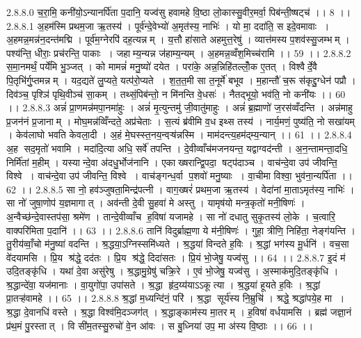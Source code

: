 2.8.8.0
च॒रा॒मि॒ कनी॑यो॒ऽन्यानर्पि॑ता प॒दानि॒ यज्व॑सु हवामहे वि॒ष्ठा लो॒कास्सु॒वीर॒मर्वा॒ पिब॑न्ती॒ष्षट्च॑ ।। 8 ।।
2.8.8.1
अ॒हम॑स्मि प्रथम॒जा ऋ॒तस्य॑ । पूर्व॑न्दे॒वेभ्यो॑ अ॒मृत॑स्य॒ नाभिः॑ । यो मा॒ ददा॑ति॒ स इदे॒वमावाः । अ॒हमन्न॒मन्न॑न॒दन्त॑मद्मि । पूर्व॑म॒ग्नेरपि॑ दह॒त्यन्नम् । य॒त्तौ हा॑साते अहमुत्त॒रेषु॑ । व्यात्त॑मस्य प॒शव॑स्सु॒जम्भम् । पश्य॑न्ति॒ धीराः॒ प्रच॑रन्ति॒ पाकाः । जहाम्य॒न्यन्न ज॑हाम्य॒न्यम् । अ॒हमन्न॒व्वँश॒मिच्च॑रामि ।। 59 ।।
2.8.8.2
स॒मा॒नमर्थं॒ पर्ये॑मि भु॒ञ्जत् । को मामन्नं॑ मनु॒ष्यो॑ दयेत । परा॑के॒ अन्न॒न्निहि॑तल्लोँ॒क ए॒तत् । विश्वैर्दे॒वै पि॒तृभि॑र्गु॒प्तमन्नम् । यद॒द्यते॑ लु॒प्यते॒ यत्प॑रो॒प्यते । श॒त॒त॒मी सा त॒नूर्मे॑ बभूव । म॒हान्तौ॑ च॒रू स॑कृद्दु॒ग्धेन॑ पप्रौ । दिव॑ञ्च॒ पृश्ञि॑ पृथि॒वीञ्च॑ सा॒कम् । तथ्सं॒पिब॑न्तो॒ न मि॑नन्ति वे॒धसः॑ । नैतद्भूयो॒ भव॑ति॒ नो कनी॑यः ।। 60 ।।
2.8.8.3
अन्नं॑ प्रा॒णमन्न॑मपा॒नमा॑हुः । अन्नं॑ मृ॒त्युन्तमु॑ जी॒वातु॑माहुः । अन्नं॑ ब्र॒ह्माणो॑ ज॒रस॑व्वँदन्ति । अन्न॑माहु प्र॒जन॑नं प्र॒जानाम् । मोघ॒मन्न॑व्विँन्दते॒ अप्र॑चेताः । स॒त्यं ब्र॑वीमि व॒ध इथ्स तस्य॑ । नार्य॒मणं॒ पुष्य॑ति॒ नो सखा॑यम् । केव॑लाघो भवति केवला॒दी । अ॒हं मे॒घस्स्त॒नय॒न्वऱ़्ष॑न्नस्मि । माम॑दन्त्य॒हम॑द्म्य॒न्यान् ।। 61 ।।
2.8.8.4
अ॒ह सद॒मृतो॑ भवामि । मदा॑दि॒त्या अधि॒ सर्वे॑ तपन्ति । दे॒वीव्वाँच॑मजनयन्त॒ यद्वाग्वद॑न्ती । अ॒न॒न्तामन्ता॒दधि॒ निर्मि॑तां म॒हीम् । यस्यान्दे॒वा अ॑दधु॒र्भोज॑नानि । एकाख्षरान्द्वि॒पदा॒॒ षट्प॑दाञ्च । वाच॑न्दे॒वा उप॑ जीवन्ति॒ विश्वे । वाच॑न्दे॒वा उप॑ जीवन्ति॒ विश्वे । वाच॑ङ्गन्ध॒र्वा प॒शवो॑ मनु॒ष्याः । वा॒चीमा विश्वा॒ भुव॑ना॒न्यर्पि॑ता ।। 62 ।।
2.8.8.5
सा नो॒ हव॑ञ्जुषता॒मिन्द्र॑पत्नी । वाग॒ख्षरं॑ प्रथम॒जा ऋ॒तस्य॑ । वेदा॑नां मा॒ताऽमृत॑स्य॒ नाभिः॑ । सा नो॑ जुषा॒णोप॑ य॒ज्ञमागात् । अव॑न्ती दे॒वी सु॒हवा॑ मे अस्तु । यामृष॑यो मन्त्र॒कृतो॑ मनी॒षिणः॑ । अ॒न्वैच्छ॑न्दे॒वास्तप॑सा॒ श्रमे॑ण । तान्दे॒वीव्वाँच॑ ह॒विषा॑ यजामहे । सा नो॑ दधातु सुकृ॒तस्य॑ लो॒के । च॒त्वारि॒ वाक्परि॑मिता प॒दानि॑ ।। 63 ।।
2.8.8.6
तानि॑ विदुर्ब्राह्म॒णा ये म॑नी॒षिणः॑ । गुहा॒ त्रीणि॒ निहि॑ता॒ नेङ्ग॑यन्ति । तु॒रीय॑व्वाँ॒चो म॑नु॒ष्या॑ वदन्ति । श्र॒द्धया॒ऽग्निस्समि॑ध्यते । श्र॒द्धया॑ विन्दते ह॒विः । श्र॒द्धां भग॑स्य मू॒र्धनि॑ । वच॒सा वे॑दयामसि । प्रि॒य श्र॑द्धे॒ दद॑तः । प्रि॒य श्र॑द्धे॒ दिदा॑सतः । प्रि॒यं भो॒जेषु॒ यज्व॑सु ।। 64 ।।
2.8.8.7
इ॒दं म॑ उदि॒तङ्कृ॑धि । यथा॑ दे॒वा असु॑रेषु । श्र॒द्धामु॒ग्रेषु॑ चक्रि॒रे । ए॒वं भो॒जेषु॒ यज्व॑सु । अ॒स्माक॑मुदि॒तङ्कृ॑धि । श्र॒द्धान्दे॑वा॒ यज॑मानाः । वा॒युगो॑पा॒ उपा॑सते । श्र॒द्धा हृ॑द॒य्य॑याऽऽकूत्या । श्र॒द्धया॑ हूयते ह॒विः । श्र॒द्धां प्रा॒तऱ्ह॑वामहे ।। 65 ।।
2.8.8.8
श्र॒द्धां म॒ध्यन्दि॑नं॒ परि॑ । श्र॒द्धा सूर्य॑स्य नि॒म्रुचि॑ । श्रद्धे॒ श्रद्धा॑पये॒ह मा । श्र॒द्धा दे॒वानधि॑ वस्ते । श्र॒द्धा विश्व॑मि॒दञ्जग॑त् । श्र॒द्धाङ्काम॑स्य मा॒तरम् । ह॒विषा॑ वर्धयामसि । ब्रह्म॑ जज्ञा॒नं प्र॑थ॒मं पु॒रस्तात् । वि सी॑म॒तस्सु॒रुचो॑ वे॒न आ॑वः । स बु॒ध्निया॑ उप॒ मा अ॑स्य वि॒ष्ठाः ।। 66 ।।

